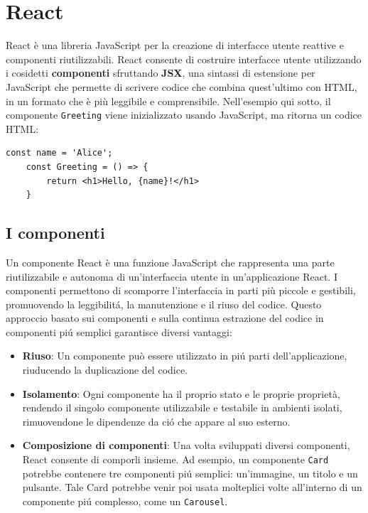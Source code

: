 \documentclass[target=bach,aauheader=,style=]{thud}
\begin{document}
\section{React}
React è una libreria JavaScript per la creazione di interfacce utente reattive e componenti riutilizzabili. React consente di costruire interfacce utente utilizzando i cosidetti \textbf{componenti} sfruttando \textbf{JSX}, una sintassi di estensione per JavaScript che permette di scrivere codice che combina quest'ultimo con HTML, in un formato che è più leggibile e comprensibile. Nell'esempio qui sotto,  il componente \texttt{Greeting} viene inizializzato usando JavaScript, ma ritorna un codice HTML:

\begin{lstlisting}[caption=Esempio di codice React]
    const name = 'Alice';   
    const Greeting = () => {
        return <h1>Hello, {name}!</h1>
    } 
\end{lstlisting}

\subsection{I componenti}
Un componente React è una funzione JavaScript che rappresenta una parte riutilizzabile e autonoma di un'interfaccia utente in un'applicazione React. I componenti permettono di scomporre l'interfaccia in parti più piccole e gestibili, promuovendo la leggibilitá, la manutenzione e il riuso del codice. Questo approccio basato sui componenti e sulla continua estrazione del codice in componenti piú semplici garantisce diversi vantaggi:

\begin{itemize}
    \item \textbf{Riuso}: Un componente può essere utilizzato in piú parti dell'applicazione, riuducendo la duplicazione del codice.
    \item \textbf{Isolamento}: Ogni componente ha il proprio stato e le proprie proprietà, rendendo il singolo componente utilizzabile e testabile in ambienti isolati, rimuovendone le dipendenze da ció che appare al suo esterno.
    \item \textbf{Composizione di componenti}: Una volta sviluppati diversi componenti, React consente di comporli insieme. Ad esempio, un componente \texttt{Card} potrebbe contenere tre componenti piú semplici: un'immagine, un titolo e un pulsante. Tale Card potrebbe venir poi usata molteplici volte all'interno di un componente piú complesso, come un \texttt{Carousel}.
\end{itemize}
\end{document}
